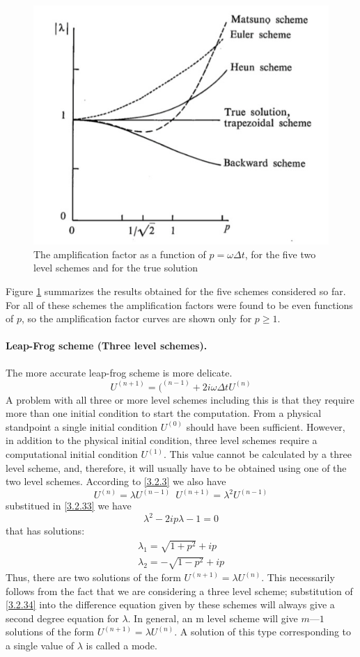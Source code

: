 \begin{figure}[h]
    \centering
    \includegraphics[width=0.50\linewidth]{uploads/Screenshot 2024-11-12 101958.png}
    \caption{The amplification factor as a function of $p=\omega\Delta t$, for the five two level schemes and for the true solution}
    \label{fig:3.2.1}
\end{figure}
Figure \ref{fig:3.2.1} summarizes the results obtained for the five schemes considered so far. For all of these schemes the amplification factors were found to be even functions of $p$, so the amplification factor curves are shown only for $p\geq 1$.
\paragraph{Leap-Frog scheme (Three level schemes).}
The more accurate leap-frog scheme is more delicate. 
\begin{equation}\label{3.2.33}
    U^{(n+1)}=(^{(n-1)}+2i\omega\Delta tU^{(n)}
\end{equation}
A problem with all three or more level schemes including this is that they require more than one initial condition to start the computation. From a physical standpoint a single initial condition $U^{(0)}$ should have been sufficient. However, in addition to the physical initial condition, three level schemes require a computational initial condition $U^{(1)}$. This value cannot be calculated by a three level scheme, and, therefore, it will usually have to be obtained using one of the two level schemes. According to \ref{3.2.3} we also have
\begin{equation}\label{3.2.34}
    U^{(n)}=\lambda U^{(n-1)}\,\,\, U^{(n+1)}=\lambda^2U^{(n-1)}
\end{equation}
substitued in \ref{3.2.33} we have
$$\lambda^2-2ip\lambda-1=0$$ that has solutions:
\begin{align*}
    \lambda_1=\sqrt{1+p^2}+ip \\
    \lambda_2=-\sqrt{1-p^2}+ip
\end{align*}
Thus, there are two solutions of the form $U^{(n+1)}=\lambda U^{(n)}$. This necessarily follows from the fact that we are considering a three level scheme; substitution of \ref{3.2.34} into the difference equation given by these schemes will always give a second degree equation for $\lambda$. In general, an m level scheme will give $m — 1$ solutions of the form $U^{(n+1)}=\lambda U^{(n)}$. A solution of this type corresponding to a single value of $\lambda$ is called a mode.

